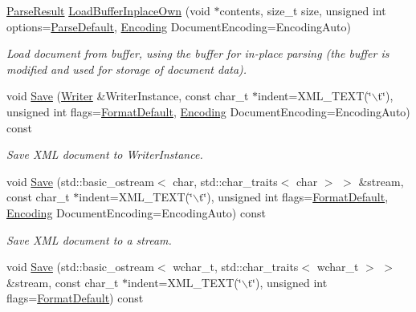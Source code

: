 \begin{DoxyCompactItemize}
\hyperlink{structphys_1_1xml_1_1ParseResult}{ParseResult} \hyperlink{classphys_1_1xml_1_1Document_a712ff68748c616d5bca8bd6ead8c5799}{LoadBufferInplaceOwn} (void $\ast$contents, size\_\-t size, unsigned int options=\hyperlink{namespacephys_1_1xml_aa6b8f7f8c2322fd683a235b498834d60}{ParseDefault}, \hyperlink{namespacephys_1_1xml_a420f5de782438f88160321385bea2015}{Encoding} DocumentEncoding=EncodingAuto)
\begin{DoxyCompactList}\small\item\em Load document from buffer, using the buffer for in-\/place parsing (the buffer is modified and used for storage of document data). \item\end{DoxyCompactList}\item 
void \hyperlink{classphys_1_1xml_1_1Document_a1e3761e11294b3d526ff13d76ee8be0d}{Save} (\hyperlink{classphys_1_1xml_1_1Writer}{Writer} \&WriterInstance, const char\_\-t $\ast$indent=XML\_\-TEXT(\char`\"{}$\backslash$t\char`\"{}), unsigned int flags=\hyperlink{namespacephys_1_1xml_a08bf6aab51f79929d9097706a5e64408}{FormatDefault}, \hyperlink{namespacephys_1_1xml_a420f5de782438f88160321385bea2015}{Encoding} DocumentEncoding=EncodingAuto) const 
\begin{DoxyCompactList}\small\item\em Save XML document to WriterInstance. \item\end{DoxyCompactList}\item 
void \hyperlink{classphys_1_1xml_1_1Document_aa9f44d46ec6139680ebde26122cc6281}{Save} (std::basic\_\-ostream$<$ char, std::char\_\-traits$<$ char $>$ $>$ \&stream, const char\_\-t $\ast$indent=XML\_\-TEXT(\char`\"{}$\backslash$t\char`\"{}), unsigned int flags=\hyperlink{namespacephys_1_1xml_a08bf6aab51f79929d9097706a5e64408}{FormatDefault}, \hyperlink{namespacephys_1_1xml_a420f5de782438f88160321385bea2015}{Encoding} DocumentEncoding=EncodingAuto) const 
\begin{DoxyCompactList}\small\item\em Save XML document to a stream. \item\end{DoxyCompactList}\item 
void \hyperlink{classphys_1_1xml_1_1Document_a034a5497b68d8531886fdc7a6a67bd7d}{Save} (std::basic\_\-ostream$<$ wchar\_\-t, std::char\_\-traits$<$ wchar\_\-t $>$ $>$ \&stream, const char\_\-t $\ast$indent=XML\_\-TEXT(\char`\"{}$\backslash$t\char`\"{}), unsigned int flags=\hyperlink{namespacephys_1_1xml_a08bf6aab51f79929d9097706a5e64408}{FormatDefault}) const 

\end{DoxyCompactItemize}
